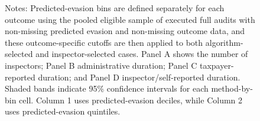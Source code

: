 \documentclass{article}
\begin{document}
\begin{figure}[H]
\begin{threeparttable}
\begin{tablenotes}
    \tiny \item Notes: Predicted-evasion bins are defined separately for each outcome using the pooled eligible sample of executed full audits with non-missing predicted evasion and non-missing outcome data, and these outcome-specific cutoffs are then applied to both algorithm-selected and inspector-selected cases. Panel A shows the number of inspectors; Panel B administrative duration; Panel C taxpayer-reported duration; and Panel D inspector/self-reported duration. Shaded bands indicate 95\% confidence intervals for each method-by-bin cell. Column 1 uses predicted-evasion deciles, while Column 2 uses predicted-evasion quintiles.
    \end{tablenotes}
    \end{threeparttable}
\end{figure}
\end{document}
